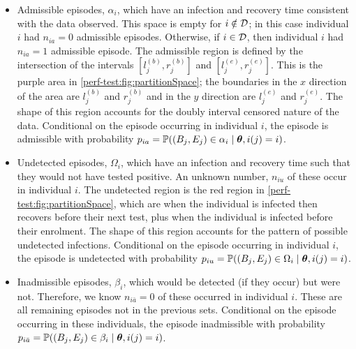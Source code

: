 \documentclass[thesis.tex]{subfiles}
\begin{document}
\begin{itemize}
\item
  Admissible episodes, $\alpha_i$, which have an infection and recovery time consistent with the data observed.
  This space is empty for $i \notin \mathcal{D}$; in this case individual $i$ had $n_{ia} = 0$ admissible episodes.
  Otherwise, if $i \in \mathcal{D}$, then individual $i$ had $n_{ia} =1$ admissible episode.
  The admissible region is defined by the intersection of the intervals $[l_j^{(b)}, r_j^{(b)}]$ and $[l_j^{(e)}, r_j^{(e)}]$.
  This is the purple area in \cref{perf-test:fig:partitionSpace}; the boundaries in the $x$ direction of the area are $l_j^{(b)}$ and $r_j^{(b)}$ and in the $y$ direction are $l_j^{(e)}$ and $r_j^{(e)}$.
  The shape of this region accounts for the doubly interval censored nature of the data.
  Conditional on the episode occurring in individual $i$, the episode is admissible with probability $p_{ia} = \operatorname{\mathbb{P}}((B_j, E_j) \in \alpha_i \mid \bm{\theta}, i(j) = i)$.
  \label{perf-test:def:admissible}
\item
  Undetected episodes, $\Omega_i$, which have an infection and recovery time such that they would not have tested positive.
  An unknown number, $n_{iu}$ of these occur in individual $i$.
  The undetected region is the red region in \cref{perf-test:fig:partitionSpace}, which are when the individual is infected then recovers before their next test, plus when the individual is infected before their enrolment.
  The shape of this region accounts for the pattern of possible undetected infections.
  Conditional on the episode occurring in individual $i$, the episode is undetected with probability $p_{iu} = \operatorname{\mathbb{P}}((B_j, E_j) \in \Omega_i \mid \bm{\theta}, i(j) = i)$.
\item
  Inadmissible episodes, $\beta_i$, which would be detected (if they occur) but were not.
  Therefore, we know $n_{i\bar{a}} = 0$ of these occurred in individual $i$.
  These are all remaining episodes not in the previous sets.
  Conditional on the episode occurring in these individuals, the episode inadmissible with probability $p_{i\bar{a}} = \operatorname{\mathbb{P}}((B_j, E_j) \in \beta_i \mid \bm{\theta}, i(j) = i)$.
\end{itemize}
\end{document}
